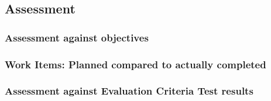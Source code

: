 \subsection*{Assessment}



\subsubsection*{Assessment against objectives}

\subsubsection*{Work Items: Planned compared to actually completed}

\subsubsection*{Assessment against Evaluation Criteria Test results}

